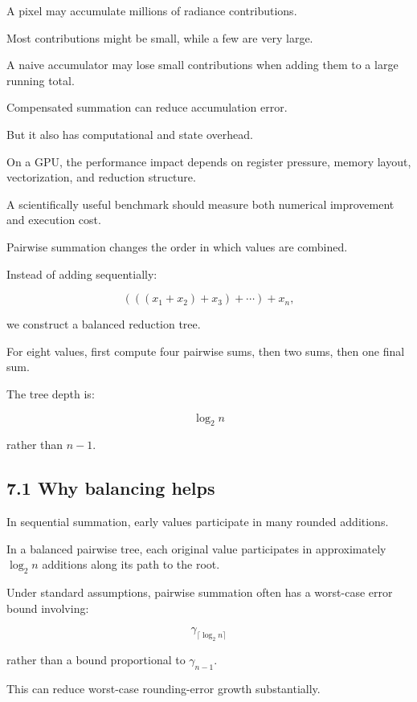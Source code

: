 \hypertarget{02-foundations-ii-ch028-application-to-monte-carlo-rendering}{}

A pixel may accumulate millions of radiance contributions.

Most contributions might be small, while a few are very large.

A naive accumulator may lose small contributions when adding them to a large running total.

Compensated summation can reduce accumulation error.

But it also has computational and state overhead.

On a GPU, the performance impact depends on register pressure, memory layout, vectorization, and reduction structure.

A scientifically useful benchmark should measure both numerical improvement and execution cost.

Pairwise summation changes the order in which values are combined.

Instead of adding sequentially:

\[ (((x_1+x_2)+x_3)+\cdots)+x_n, \]

we construct a balanced reduction tree.

For eight values, first compute four pairwise sums, then two sums, then one final sum.

The tree depth is:

\[ \log_2 n \]

rather than \(n-1\).

\subsection{7.1 Why balancing helps}\label{02-foundations-ii-ch028-why-balancing-helps}

\hypertarget{02-foundations-ii-ch028-why-balancing-helps}{}

In sequential summation, early values participate in many rounded additions.

In a balanced pairwise tree, each original value participates in approximately \(\log_2 n\) additions along its path to the root.

Under standard assumptions, pairwise summation often has a worst-case error bound involving:

\[ \gamma_{\lceil\log_2n\rceil} \]

rather than a bound proportional to \(\gamma_{n-1}\).

This can reduce worst-case rounding-error growth substantially.

